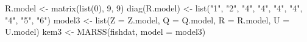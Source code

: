 \begin{Schunk}
\begin{Sinput}
 R.model <- matrix(list(0), 9, 9)
 diag(R.model) <- list("1", "2", "4", "4", "4", "4", "4", "5", "6")
 model3 <- list(Z = Z.model, Q = Q.model, R = R.model, U = U.model)
 kem3 <- MARSS(fishdat, model = model3)
\end{Sinput}
\end{Schunk}
